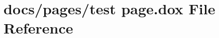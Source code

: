 \hypertarget{test_01page_8dox}{\section{docs/pages/test page.\-dox File Reference}
\label{test_01page_8dox}
}
